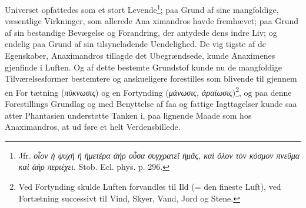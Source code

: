 \documentclass[12pt,a4paper]{book}
\newcommand{\gk}[1]{\textit{#1}}
\begin{document}
Universet opfattedes som et stort Levende\footnote{Jfr. \gk{οἷον ἡ ψυχὴ ἡ ἡμετέρα ἀήρ οὖσα συγχρατεῖ ἡμᾶς, καὶ ὅλον τὸν κόσμον πνεῦμα καὶ ἀὴρ περιέχει}. Stob. Ecl. phys. p. 296.}; paa Grund af
sine mangfoldige, væsentlige Virkninger, som allerede Ana\-%
\setcounter{footnote}{0}%
ximandros havde fremhævet; paa Grund af sin bestandige
Bevægelse og Forandring, der antydede dens indre Liv; og
endelig paa Grund af sin tilsyneladende Uendelighed. De vig\-%
tigste af de Egenskaber, Anaximandros tillagde det Ubegrændsede,
kunde Anaximenes gjenfinde i Luften. Og af dette bestemte
Grundstof kunde nu de mangfoldige Tilværelsesformer bestemtere
og anskueligere forestilles som blivende til gjennem en For\-%
tætning (\gk{πύκνωσις}) og en Fortynding (\gk{μάνωσις, ἀραίωσις})\footnote{Ved Fortynding skulde Luften forvandles til Ild (= den fineste Luft), ved Fortætning successivt til Vind, Skyer, Vand, Jord og Stene.},
og paa denne Forestillings Grundlag og med Benyttelse af faa
og fattige Iagttagelser kunde saa atter Phantasien understøtte
Tanken i, paa lignende Maade som hos Anaximandros, at ud\-%
føre et helt Verdensbillede.
\end{document}
